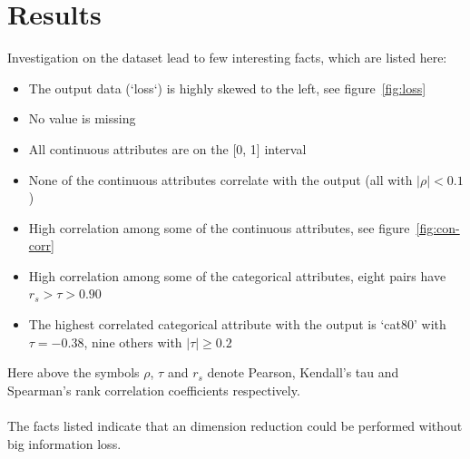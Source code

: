 \documentclass[a4paper]{article}
\begin{document}
\section{Results}
Investigation on the dataset lead to few interesting facts, which are listed here:
\begin{itemize}
    \item The output data (‘loss‘) is highly skewed to the left, see figure~\ref{fig:loss}
    \item No value is missing
    \item All continuous attributes are on the [0, 1] interval
    \item None of the continuous attributes correlate with the output (all with $|\rho| < 0.1$)
    \item High correlation among some of the continuous attributes, see figure~\ref{fig:con-corr}
    \item High correlation among some of the categorical attributes, eight pairs have $r_s > \tau > 0.90$
    \item The highest correlated categorical attribute with the output is ‘cat80’ with $\tau=-0.38$, nine others with $|\tau| \geq 0.2$
\end{itemize}
Here above the symbols $\rho$, $\tau$ and $r_s$ denote Pearson, Kendall's tau and Spearman’s rank correlation coefficients respectively. \\\\
The facts listed indicate that an dimension reduction could be performed without big information loss.
\end{document}
